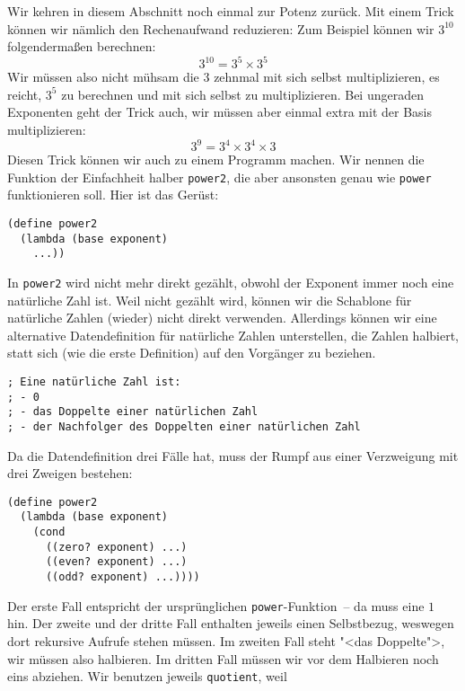%
Wir kehren in diesem Abschnitt noch einmal zur Potenz zurück.  Mit
einem Trick können wir nämlich den Rechenaufwand reduzieren: Zum
Beispiel können wir $3^{10}$ folgendermaßen berechnen:
%
\begin{displaymath}
  3^{10}   = 3^5 \times 3^5
\end{displaymath}
%
Wir müssen also nicht mühsam die 3 zehnmal mit sich selbst
multiplizieren, es reicht, $3^5$ zu berechnen und mit sich selbst zu
multiplizieren.  Bei ungeraden Exponenten geht der Trick auch, wir müssen aber einmal extra
mit der Basis multiplizieren:
%
\begin{displaymath}
  3^9   = 3^4 \times 3^4 \times 3
\end{displaymath}
%
Diesen Trick können wir auch zu einem Programm machen.  Wir nennen die
Funktion der Einfachheit halber \lstinline{power2}, die aber ansonsten
genau wie \lstinline{power} funktionieren soll.  Hier ist das Gerüst:\label{function:power2}
%
\begin{lstlisting}
(define power2
  (lambda (base exponent)
    ...))
\end{lstlisting}
%
In \lstinline{power2} wird nicht mehr direkt gezählt, obwohl der
Exponent immer noch eine natürliche Zahl ist.  Weil nicht gezählt
wird, können wir die Schablone für natürliche Zahlen (wieder) nicht
direkt verwenden.  Allerdings können wir eine alternative
Datendefinition für natürliche Zahlen unterstellen, die Zahlen
halbiert, statt sich (wie die erste Definition) auf den Vorgänger zu beziehen.
%
\begin{lstlisting}
; Eine natürliche Zahl ist:
; - 0
; - das Doppelte einer natürlichen Zahl
; - der Nachfolger des Doppelten einer natürlichen Zahl
\end{lstlisting}
%
Da die Datendefinition drei Fälle hat, muss der Rumpf aus
einer Verzweigung mit drei Zweigen bestehen:
%
\begin{lstlisting}
(define power2
  (lambda (base exponent)
    (cond
      ((zero? exponent) ...)
      ((even? exponent) ...)
      ((odd? exponent) ...))))
\end{lstlisting}
%
Der erste Fall entspricht der ursprünglichen
\lstinline{power}-Funktion~-- da muss eine $1$ hin.  Der zweite und der
dritte Fall enthalten jeweils einen Selbstbezug, weswegen dort
rekursive Aufrufe stehen müssen.  Im zweiten Fall steht "<das
Doppelte">, wir müssen also halbieren.  Im dritten Fall müssen wir vor dem Halbieren
noch eins abziehen.  Wir benutzen jeweils \lstinline{quotient}, weil
